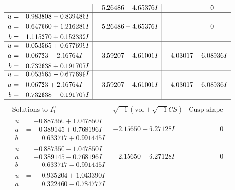 \documentclass[1p]{elsarticle_modified}
\theoremstyle{definition}
\newcommand{\I}{\sqrt{-1}}
\begin{document}
$$\begin{array}{c|c|c}
 & \phantom{-}5.26486 - 4.65376 I & \phantom{-0.000000 } 0 \\ \hline\begin{aligned}
u &= \phantom{-}0.983808 - 0.839486 I \\
a &= \phantom{-}0.647660 + 1.216280 I \\
b &= \phantom{-}1.115270 + 0.152332 I\end{aligned}
 & \phantom{-}5.26486 + 4.65376 I & \phantom{-0.000000 } 0 \\ \hline\begin{aligned}
u &= \phantom{-}0.053565 + 0.677699 I \\
a &= \phantom{-}0.06723 - 2.16764 I \\
b &= \phantom{-}0.732638 + 0.191707 I\end{aligned}
 & \phantom{-}3.59207 + 4.61001 I & \phantom{-}4.03017 - 6.08936 I \\ \hline\begin{aligned}
u &= \phantom{-}0.053565 - 0.677699 I \\
a &= \phantom{-}0.06723 + 2.16764 I \\
b &= \phantom{-}0.732638 - 0.191707 I\end{aligned}
 & \phantom{-}3.59207 - 4.61001 I & \phantom{-}4.03017 + 6.08936 I\\
 \hline 
 \end{array}$$\newpage$$\begin{array}{c|c|c}  
\text{Solutions to }I^u_{1}& \I (\text{vol} + \sqrt{-1}CS) & \text{Cusp shape}\\
 \hline 
\begin{aligned}
u &= -0.887350 + 1.047850 I \\
a &= -0.389145 + 0.768196 I \\
b &= \phantom{-}0.633717 + 0.991445 I\end{aligned}
 & -2.15650 + 6.27128 I & \phantom{-0.000000 } 0 \\ \hline\begin{aligned}
u &= -0.887350 - 1.047850 I \\
a &= -0.389145 - 0.768196 I \\
b &= \phantom{-}0.633717 - 0.991445 I\end{aligned}
 & -2.15650 - 6.27128 I & \phantom{-0.000000 } 0 \\ \hline\begin{aligned}
u &= \phantom{-}0.935204 + 1.043390 I \\
a &= \phantom{-}0.322460 - 0.784777 I \\

\end{aligned}
\end{array}$$
\end{document}
